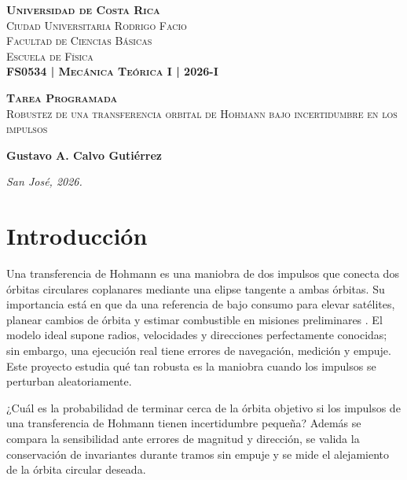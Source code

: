 \documentclass[12pt]{article}
\newcommand{\institucion}{Universidad de Costa Rica}
\newcommand{\campus}{Ciudad Universitaria Rodrigo Facio}
\newcommand{\facultad}{Facultad de Ciencias Básicas}
\newcommand{\escuela}{Escuela de Física}
\newcommand{\curso}{FS0534 | Mecánica Teórica I | 2026-I}
\newcommand{\tituloanteproyecto}{Tarea Programada}
\newcommand{\titulo}{Robustez de una transferencia orbital de Hohmann bajo incertidumbre en los impulsos}
\newcommand{\autor}{Gustavo A. Calvo Gutiérrez}
\newcommand{\lugarfecha}{San José, 2026.}
\begin{document}
\begin{titlepage}
  \begin{center}
    \LARGE \textbf{\textsc{\institucion}}
    \Large
    \\[1cm]
    \textsc{\campus}
    \\[0.1cm]
    \textsc{\facultad}
    \\[0.1cm]
    \textsc{\escuela} \\
    \vspace*{20 mm}
    \LARGE{\textsc{\textbf{\curso}}}
  \end{center}

  \vspace{2cm}

  \hrulefill
  \begin{center}
    \large \textbf{\textsc{\tituloanteproyecto}}
    \\[0.5cm]
    \textsc{\titulo}
  \end{center}
  \hrulefill

  \vfill

  \begin{center}
    \large \textbf{\autor}
  \end{center}

  \vspace{1cm}

  \begin{center}
    \textit{\lugarfecha}
  \end{center}
\end{titlepage}

\section{Introducción}

Una transferencia de Hohmann es una maniobra de dos impulsos que conecta dos
órbitas circulares coplanares mediante una elipse tangente a ambas órbitas. Su
importancia está en que da una referencia de bajo consumo para elevar satélites,
planear cambios de órbita y estimar combustible en misiones preliminares
\cite{bate1971,curtis2020}. El modelo ideal supone radios, velocidades y
direcciones perfectamente conocidas; sin embargo, una ejecución real tiene
errores de navegación, medición y empuje. Este proyecto estudia qué tan robusta
es la maniobra cuando los impulsos se perturban aleatoriamente.

¿Cuál es la probabilidad de terminar cerca de
la órbita objetivo si los impulsos de una transferencia de Hohmann tienen
incertidumbre pequeña? Además se compara la sensibilidad ante errores de
magnitud y dirección, se valida la conservación de invariantes durante tramos
sin empuje y se mide el alejamiento de la órbita circular deseada.
\end{document}
